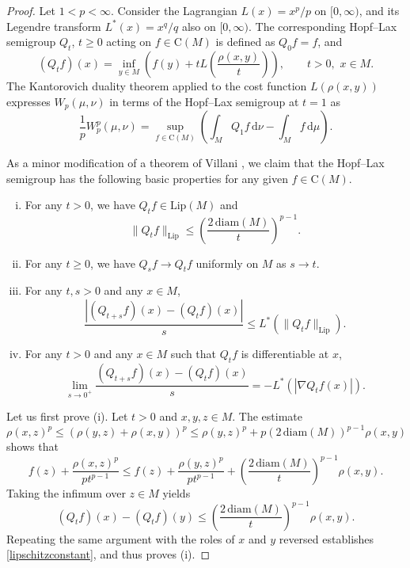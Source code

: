 \documentclass[11pt,a4paper]{article}
\theoremstyle{definition}
\begin{document}
\begin{proof} Let $1<p<\infty$. Consider the Lagrangian $L(x)=x^p/p$ on $[0,\infty)$, and its Legendre transform $L^*(x)=x^q/q$ also on $[0,\infty)$. The corresponding Hopf--Lax semigroup $Q_t$, $t \ge 0$ acting on $f \in \mathrm{C}(M)$ is defined as $Q_0 f = f$, and
\[ (Q_t f)(x) = \inf_{y \in M} \left( f(y) + t L \left( \frac{\rho (x,y)}{t} \right) \right), \qquad t>0, \,\, x \in M. \]
The Kantorovich duality theorem \cite[p.\ 70]{VI} applied to the cost function $L(\rho(x,y))$ expresses $W_p(\mu, \nu)$ in terms of the Hopf--Lax semigroup at $t=1$ as
\begin{equation}\label{hopflax}
\frac{1}{p}W_p^p (\mu, \nu) = \sup_{f \in \mathrm{C}(M)} \left( \int_M Q_1 f \, \mathrm{d}\nu - \int_M f \, \mathrm{d}\mu  \right) .
\end{equation}

As a minor modification of a theorem of Villani \cite[p.\ 626]{VI}, we claim that the Hopf--Lax semigroup has the following basic properties for any given $f \in \mathrm{C}(M)$.
\begin{enumerate}[(i)]
\item For any $t>0$, we have $Q_t f \in \mathrm{Lip}(M)$ and
\begin{equation}\label{lipschitzconstant}
\| Q_t f \|_{\mathrm{Lip}} \le \left( \frac{2 \, \mathrm{diam}(M)}{t} \right)^{p-1}.
\end{equation}

\item For any $t \ge 0$, we have $Q_s f \to Q_t f$ uniformly on $M$ as $s \to t$.

\item For any $t,s>0$ and any $x \in M$,
\[ \frac{|(Q_{t+s} f)(x) - (Q_t f)(x)|}{s} \le L^* \left( \| Q_t f \|_{\mathrm{Lip}} \right) . \]

\item For any $t>0$ and any $x \in M$ such that $Q_t f$ is differentiable at $x$,
\[ \lim_{s \to 0^+} \frac{(Q_{t+s} f)(x) - (Q_t f)(x)}{s} = - L^* (|\nabla Q_t f(x)|) . \]
\end{enumerate}

Let us first prove (i). Let $t>0$ and $x,y,z \in M$. The estimate
\[ \rho (x,z)^p \le (\rho (y,z) + \rho (x,y))^p \le \rho (y,z)^p + p (2 \, \mathrm{diam}(M))^{p-1} \rho (x,y) \]
shows that
\[ f(z) + \frac{\rho(x,z)^p}{p t^{p-1}} \le f(z) + \frac{\rho(y,z)^p}{p t^{p-1}} + \left( \frac{2 \, \mathrm{diam}(M)}{t} \right)^{p-1} \rho(x,y) . \]
Taking the infimum over $z \in M$ yields
\[ (Q_t f)(x) - (Q_t f)(y) \le \left( \frac{2 \, \mathrm{diam}(M)}{t} \right)^{p-1} \rho(x,y) . \]
Repeating the same argument with the roles of $x$ and $y$ reversed establishes \eqref{lipschitzconstant}, and thus proves (i).


\end{proof}
\end{document}
